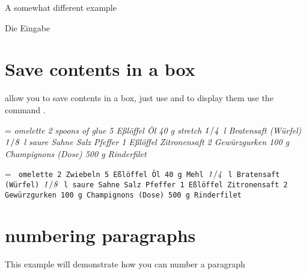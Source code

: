 \begin{teX}
\begin{teX}
\begin{teX}
\begin{teX}
\begin{teX}
\begin{teX}
A somewhat different example

\def\LoopGrauBlock#1#2{%
\begingroup
\dimen2=0.4pt %
\def\leer{\setbox2=\vbox %
{\hbox{\box2\hskip\dimen2}\vskip\dimen2}}%
\def\doblock{%
\setbox2\BaseBlock
{\count1\dimen2}{0.4pt}{\count1\dimen2}{0.4pt}{\box2}}%
\setbox2=\vbox{#1}%
\count1=0
\loop
\advance\count1 by 2 %
\leer %
\doblock
\ifnum\count1<#2
\repeat
\box2
\endgroup}
%
\def\GrauBlock#1{\LoopGrauBlock{#1}{10}}
Die Eingabe
{}


\section*{Save contents in a box}
\tex allow you to save contents in a box, just use  and to display them use the command . 

=\vbox{\hsize
\it\obeylines\noindent
\tex omelette
2 spoons of glue
5 E\ss l\"offel \"Ol
40 g stretch
$\it 1/4$ l Bratensaft (W\"urfel)
$\it 1/8$ l saure Sahne
Salz 
Pfeffer
1 E\ss l\"offel Zitronensaft
2 Gew\"urzgurken
100 g Champignons (Dose)
500 g Rinderfilet}
\medskip



\begin{teX}
=\vbox{\hsize
\tt\obeylines
\tex omelette
2 Zwiebeln
5 E\ss l\"offel \"Ol
40 g Mehl
$\it 1/4$ l Bratensaft (W\"urfel)
$\it 1/8$ l saure Sahne
Salz Pfeffer
1 E\ss l\"offel Zitronensaft
2 Gew\"urzgurken
100 g Champignons (Dose)
500 g Rinderfilet}
\end{teX}

\section*{numbering paragraphs}

This example will demonstrate how you can number a paragraph


\begin{teX}
\long{}


\end{teX}
\end{teX}
\end{teX}
\end{teX}
\end{teX}
\end{teX}
\end{teX}
